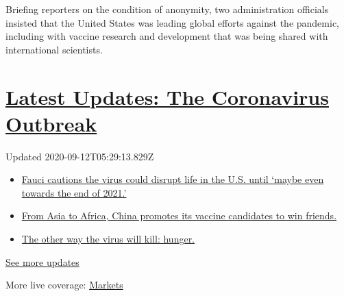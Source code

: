 Briefing reporters on the condition of anonymity, two administration
officials insisted that the United States was leading global efforts
against the pandemic, including with vaccine research and development
that was being shared with international scientists.

\hypertarget{latest-updates-the-coronavirus-outbreak}{%
\section{\texorpdfstring{\href{https://www.nytimes3xbfgragh.onion/2020/09/11/world/covid-19-coronavirus.html?action=click\&pgtype=Article\&state=default\&region=MAIN_CONTENT_1\&context=storylines_live_updates}{Latest
Updates: The Coronavirus
Outbreak}}{Latest Updates: The Coronavirus Outbreak}}\label{latest-updates-the-coronavirus-outbreak}}

Updated 2020-09-12T05:29:13.829Z

\begin{itemize}
\tightlist
\item
  \href{https://www.nytimes3xbfgragh.onion/2020/09/11/world/covid-19-coronavirus.html?action=click\&pgtype=Article\&state=default\&region=MAIN_CONTENT_1\&context=storylines_live_updates\#link-dfb8a16}{Fauci
  cautions the virus could disrupt life in the U.S. until `maybe even
  towards the end of 2021.'}
\item
  \href{https://www.nytimes3xbfgragh.onion/2020/09/11/world/covid-19-coronavirus.html?action=click\&pgtype=Article\&state=default\&region=MAIN_CONTENT_1\&context=storylines_live_updates\#link-7104d154}{From
  Asia to Africa, China promotes its vaccine candidates to win friends.}
\item
  \href{https://www.nytimes3xbfgragh.onion/2020/09/11/world/covid-19-coronavirus.html?action=click\&pgtype=Article\&state=default\&region=MAIN_CONTENT_1\&context=storylines_live_updates\#link-393ad215}{The
  other way the virus will kill: hunger.}
\end{itemize}

\href{https://www.nytimes3xbfgragh.onion/2020/09/11/world/covid-19-coronavirus.html?action=click\&pgtype=Article\&state=default\&region=MAIN_CONTENT_1\&context=storylines_live_updates}{See
more updates}

More live coverage:
\href{https://www.nytimes3xbfgragh.onion/live/2020/09/11/business/stock-market-today-coronavirus?action=click\&pgtype=Article\&state=default\&region=MAIN_CONTENT_1\&context=storylines_live_updates}{Markets}

